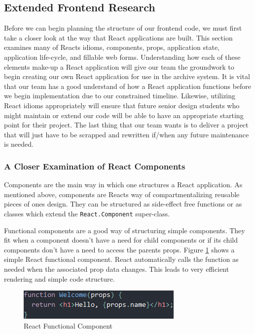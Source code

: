 \documentclass[12pt]{article}
\begin{document}
\subsection{Extended Frontend Research}

Before we can begin planning the structure of our frontend code, we must first take a closer look at the way that React applications are built. This section examines many of Reacts idioms, components, props, application state, application life-cycle, and fillable web forms. Understanding how each of these elements make-up a React application will give our team the groundwork to begin creating our own React application for use in the archive system. It is vital that our team has a good understand of how a React application functions before we begin implementation due to our constrained timeline. Likewise, utilizing React idioms appropriately will ensure that future senior design students who might maintain or extend our code will be able to have an appropriate starting point for their project. The last thing that our team wants is to deliver a project that will just have to be scrapped and rewritten if/when any future maintenance is needed.

\subsubsection{A Closer Examination of React Components}

Components are the main way in which one structures a React application. As mentioned above, components are Reacts way of compartmentalizing reusable pieces of ones design. They can be structured as side-effect free functions or as classes which extend the \texttt{React.Component} super-class.

Functional components are a good way of structuring simple components. They fit when a component doesn't have a need for child components or if its child components don't have a need to access the parents props. Figure \ref{fig:reactfunctionalcomponent} shows a simple React functional component.\cite{reactcomponentsandprops} React automatically calls the function as needed when the associated prop data changes. This leads to very efficient rendering and simple code structure.

\begin{figure}[h]
	\centering
	\includegraphics[scale=0.7]{react_functional_component}
	\caption{React Functional Component}
	\label{fig:reactfunctionalcomponent}
\end{figure}
\end{document}
